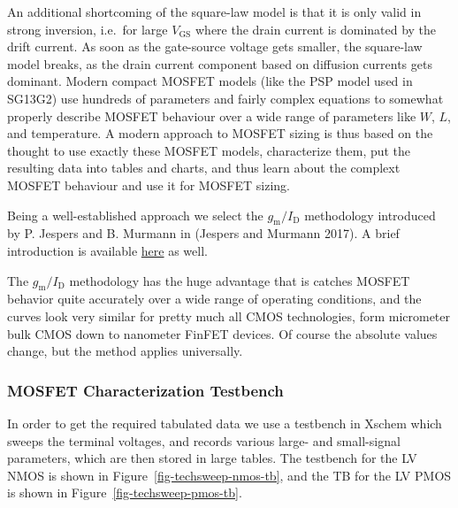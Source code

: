\documentclass[
  a4paper,
  DIV=11,
  numbers=noendperiod]{scrartcl}
\begin{document}
An additional shortcoming of the square-law model is that it is only
valid in strong inversion, i.e.~for large \(V_\mathrm{GS}\) where the
drain current is dominated by the drift current. As soon as the
gate-source voltage gets smaller, the square-law model breaks, as the
drain current component based on diffusion currents gets dominant.
Modern compact MOSFET models (like the PSP model used in SG13G2) use
hundreds of parameters and fairly complex equations to somewhat properly
describe MOSFET behaviour over a wide range of parameters like \(W\),
\(L\), and temperature. A modern approach to MOSFET sizing is thus based
on the thought to use exactly these MOSFET models, characterize them,
put the resulting data into tables and charts, and thus learn about the
complext MOSFET behaviour and use it for MOSFET sizing.

Being a well-established approach we select the
\(g_\mathrm{m}/I_\mathrm{D}\) methodology introduced by P. Jespers and
B. Murmann in (Jespers and Murmann 2017). A brief introduction is
available
\href{https://github.com/iic-jku/analog-circuit-design/blob/main/sizing/Ref_Murmann_gmID.pdf}{here}
as well.

The \(g_\mathrm{m}/I_\mathrm{D}\) methodology has the huge advantage
that is catches MOSFET behavior quite accurately over a wide range of
operating conditions, and the curves look very similar for pretty much
all CMOS technologies, form micrometer bulk CMOS down to nanometer
FinFET devices. Of course the absolute values change, but the method
applies universally.

\subsubsection{MOSFET Characterization
Testbench}\label{mosfet-characterization-testbench}

In order to get the required tabulated data we use a testbench in Xschem
which sweeps the terminal voltages, and records various large- and
small-signal parameters, which are then stored in large tables. The
testbench for the LV NMOS is shown in
Figure~\ref{fig-techsweep-nmos-tb}, and the TB for the LV PMOS is shown
in Figure~\ref{fig-techsweep-pmos-tb}.
\end{document}
